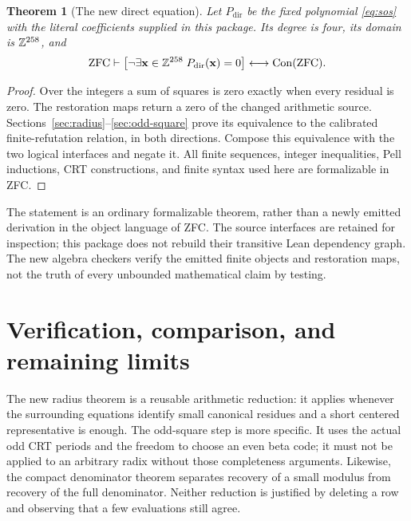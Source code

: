 \documentclass[11pt]{article}
\newcommand{\Z}{\mathbb Z}
\newcommand{\Con}{\operatorname{Con}}
\newcommand{\ZFC}{\mathrm{ZFC}}
\newtheorem{theorem}{Theorem}[section]
\theoremstyle{remark}
\numberwithin{equation}{section}
\begin{document}
\begin{theorem}[The new direct equation]\label{thm:main}
Let $P_{\mathrm{dir}}$ be the fixed polynomial \eqref{eq:sos} with the literal coefficients supplied in this package. Its degree is four, its domain is $\Z^{\SignedVariables}$, and
\[
\ZFC\vdash
\left[\neg\exists\mathbf x\in\Z^{\SignedVariables}\;
P_{\mathrm{dir}}(\mathbf x)=0\right]
\longleftrightarrow\Con(\ZFC).
\]
\end{theorem}
\begin{proof}
Over the integers a sum of squares is zero exactly when every residual is zero. The restoration maps return a zero of the changed arithmetic source. Sections~\ref{sec:radius}--\ref{sec:odd-square} prove its equivalence to the calibrated finite-refutation relation, in both directions. Compose this equivalence with the two logical interfaces and negate it. All finite sequences, integer inequalities, Pell inductions, CRT constructions, and finite syntax used here are formalizable in ZFC.
\end{proof}

The statement is an ordinary formalizable theorem, rather than a newly emitted derivation in the object language of ZFC. The source interfaces are retained for inspection; this package does not rebuild their transitive Lean dependency graph. The new algebra checkers verify the emitted finite objects and restoration maps, not the truth of every unbounded mathematical claim by testing.




\section{Verification, comparison, and remaining limits}\label{sec:verification}



The new radius theorem is a reusable arithmetic reduction: it applies whenever the surrounding equations identify small canonical residues and a short centered representative is enough. The odd-square step is more specific. It uses the actual odd CRT periods and the freedom to choose an even beta code; it must not be applied to an arbitrary radix without those completeness arguments. Likewise, the compact denominator theorem separates recovery of a small modulus from recovery of the full denominator. Neither reduction is justified by deleting a row and observing that a few evaluations still agree.
\end{document}
